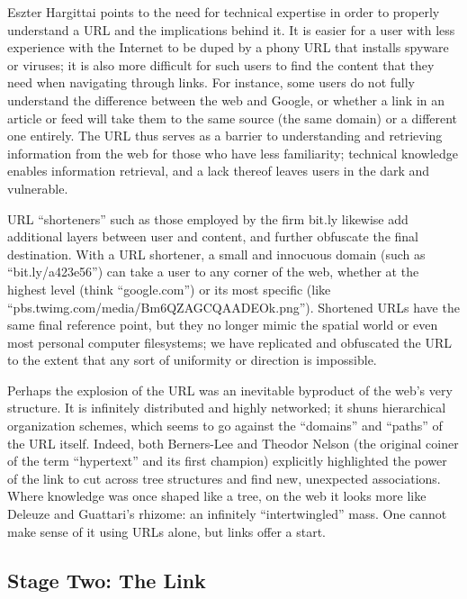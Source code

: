 Eszter Hargittai points to the need for technical expertise in order to properly understand a URL and the implications behind it.  It is easier for a user with less experience with the Internet to be duped by a phony URL that installs spyware or viruses; it is also more difficult for such users to find the content that they need when navigating through links. For instance, some users do not fully understand the difference between the web and Google, or whether a link in an article or feed will take them to the same source (the same domain) or a different one entirely. The URL thus serves as a barrier to understanding and retrieving information from the web for those who have less familiarity; technical knowledge enables information retrieval, and a lack thereof leaves users in the dark and vulnerable.

URL “shorteners” such as those employed by the firm bit.ly likewise add additional layers between user and content, and further obfuscate the final destination. With a URL shortener, a small and innocuous domain (such as “bit.ly/a423e56”) can take a user to any corner of the web, whether at the highest level (think “google.com”) or its most specific (like “pbs.twimg.com/media/Bm6QZAGCQAADEOk.png”). Shortened URLs have the same final reference point, but they no longer mimic the spatial world or even most personal computer filesystems; we have replicated and obfuscated the URL to the extent that any sort of uniformity or direction is impossible. 

Perhaps the explosion of the URL was an inevitable byproduct of the web’s very structure. It is infinitely distributed and highly networked; it shuns hierarchical organization schemes, which seems to go against the “domains” and “paths” of the URL itself. Indeed, both Berners-Lee and Theodor Nelson (the original coiner of the term “hypertext” and its first champion) explicitly highlighted the power of the link to cut across tree structures and find new, unexpected associations.  Where knowledge was once shaped like a tree, on the web it looks more like Deleuze and Guattari’s rhizome: an infinitely “intertwingled” mass. One cannot make sense of it using URLs alone, but links offer a start.

\subsection{Stage Two: The Link}


